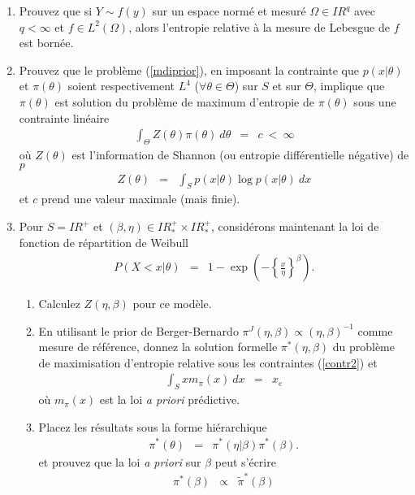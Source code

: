 \documentclass[10pt]{article}
\newcommand{\R}{I\!\!R}
\newcommand{\1}{\mathbbm{1}}
\begin{document}
\begin{enumerate}
\item Prouvez que si $Y\sim f(y)$ sur un espace normé et mesuré $\Omega\in\R^q$ avec $q<\infty$ et $f\in L^2(\Omega)$, alors l'entropie relative à la mesure de Lebesgue de $f$ est bornée. 
\item Prouvez que le problème  (\ref{mdiprior}), en imposant la contrainte que $p(x|\theta)$ et $\pi(\theta)$ soient respectivement $L^4$ ($\forall \theta\in\Theta$) sur $S$ et sur $\Theta$,  implique que $\pi(\theta)$ est solution du problème de maximum d'entropie de $\pi(\theta)$ sous une contrainte linéaire
\begin{eqnarray}
\int_{\Theta} Z(\theta) \pi(\theta) \ d\theta & = & c \ < \ \infty \label{contr2}
\end{eqnarray}
où $Z(\theta)$ est l'information de Shannon (ou entropie différentielle négative) de $p$ 
\begin{eqnarray*}
Z(\theta) & = & \int_{S} p(x|\theta) \log p(x|\theta) \ dx
\end{eqnarray*}
et $c$ prend une valeur maximale (mais finie). 
\item Pour $S=\R^+$ et $(\beta,\eta)\in\R^+_* \times \R^+_*$, considérons maintenant la loi de fonction de répartition de Weibull
\begin{eqnarray*}
P(X<x|\theta) & = & 1-\exp\left(-\left\{\frac{x}{\eta}\right\}^{\beta}\right).
\end{eqnarray*}
\begin{enumerate}
\item Calculez $Z(\eta,\beta)$ pour ce modèle.
\item En utilisant le prior de Berger-Bernardo $\pi^J(\eta,\beta)\propto (\eta,\beta)^{-1}$ comme mesure de référence, donnez la solution formelle $\pi^*(\eta,\beta)$  du problème de maximisation d'entropie relative sous les contraintes (\ref{contr2}) et
\begin{eqnarray}
\int_S x m_{\pi}(x) \ dx & = & x_e \label{cons2}
\end{eqnarray}
où $m_{\pi}(x)$ est la loi {\it a priori} prédictive. 
\item Placez les résultats sous la forme hiérarchique 
\begin{eqnarray*}
\pi^*(\theta) & = & \pi^*(\eta|\beta)\pi^*(\beta).
\end{eqnarray*}
et prouvez que la loi {\it a priori} sur $\beta$ peut s'écrire
\begin{eqnarray*}
\pi^*(\beta) & \propto & \tilde{\pi}^*(\beta) 
\end{eqnarray*}

\end{enumerate}
\end{enumerate}
\end{document}

